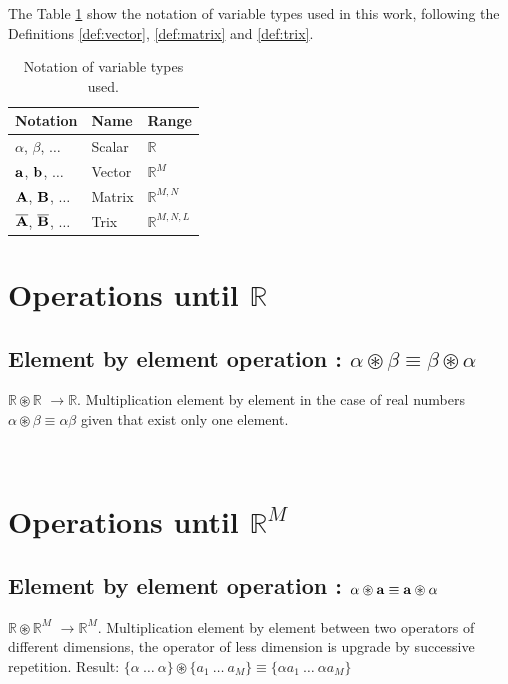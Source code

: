 \documentclass[11pt]{article}
\newcommand{\TRIX}[1]{\mathbf{\overline{\uppercase{#1}}}}
\newcommand{\MATRIX}[1]{\mathbf{\uppercase{#1}}}
\newcommand{\VECTOR}[1]{\mathbf{\lowercase{#1}}}
\newcommand{\mulebe}{\circledast}
\newcommand{\dimsep}{,}
\begin{document}
The Table \ref{tab:table1} show the notation of variable types used in this work,
following the Definitions \ref{def:vector}, \ref{def:matrix} and \ref{def:trix}.
\begin{table}[!ht]
  \centering
  \begin{tabular}{l|l|l}
  Notation     & Name   & Range \\ \hline
  $\alpha$, $\beta$, $\dots$      & Scalar & $\mathbb{R}$\\
  $\VECTOR{a}$, $\VECTOR{b}$, $\dots$ & Vector & $\mathbb{R}^{M}$\\
  $\MATRIX{A}$, $\MATRIX{B}$, $\dots$ & Matrix & $\mathbb{R}^{M \dimsep N}$\\
  $\TRIX{A}$, $\TRIX{B}$, $\dots$   & Trix   & $\mathbb{R}^{M \dimsep N \dimsep L}$\\
  \end{tabular}
  \caption{Notation of variable types used.}
  \label{tab:table1}
\end{table}

\newpage
\section{Operations until $\mathbb{R}$}

\subsection{Element by element operation : $\alpha\mulebe \beta \equiv \beta\mulebe \alpha$}
  $\mathbb{R}\mulebe \mathbb{R}$ $\rightarrow \mathbb{R}$.  Multiplication element by element
  in the case of real numbers $\alpha\mulebe \beta \equiv \alpha \beta$ given that exist only one element.  


\newpage\
\section{Operations until $\mathbb{R}^{M}$}

\subsection{Element by element operation : $\alpha\mulebe \VECTOR{a} \equiv \VECTOR{a} \mulebe \alpha$}
  $\mathbb{R}\mulebe \mathbb{R}^{M}$ $\rightarrow \mathbb{R}^{M}$.  Multiplication element by element 
  between two operators of different dimensions, the operator of less dimension is upgrade by 
  successive repetition. Result:
  $\{\alpha~\hdots~\alpha \}\mulebe \{a_1~\hdots~a_{M} \}\equiv \{\alpha a_1~\hdots~\alpha a_{M} \}$
\end{document}
